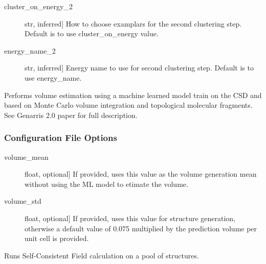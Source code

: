 \documentclass[letterpaper,10pt,english]{sphinxmanual}
\begin{document}
\begin{fulllineitems}
\begin{fulllineitems}
\begin{description}
\item[{cluster\_on\_energy\_2}] \leavevmode{[}str, inferred{]}
How to choose examplars for the second clustering step. Default
is to use cluster\_on\_energy value.

\item[{energy\_name\_2}] \leavevmode{[}str, inferred{]}
Energy name to use for second clustering step. Default is to use
energy\_name.

\end{description}

\end{fulllineitems}


\begin{fulllineitems}
\label{\detokenize{index:Genarris.genarris_master.Genarris.Estimate_Unit_Cell_Volume}}
Performs volume estimation using a machine learned model train on the
CSD and based on Monte Carlo volume integration and topological
molecular fragments. See Genarris 2.0 paper for full description.
\subsubsection*{Configuration File Options}
\begin{description}
\item[{volume\_mean}] \leavevmode{[}float, optional{]}
If provided, uses this value as the volume generation mean without
using the ML model to etimate the volume.

\item[{volume\_std}] \leavevmode{[}float, optional{]}
If provided, uses this value for structure generation, otherwise
a default value of 0.075 multiplied by the prediction volume per
unit cell is provided.

\end{description}

\end{fulllineitems}


\begin{fulllineitems}
\label{\detokenize{index:Genarris.genarris_master.Genarris.FHI_Aims_Energy_Evaluation}}
Runs Self-Consistent Field calculation on a pool of structures.

\end{fulllineitems}
\end{fulllineitems}
\end{document}
